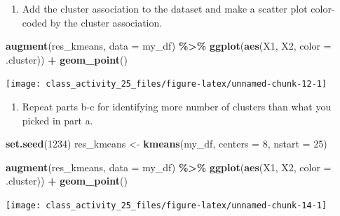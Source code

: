 \documentclass[
]{book}
\newenvironment{Shaded}{\begin{snugshade}}{\end{snugshade}}
\newcommand{\AttributeTok}[1]{\textcolor[rgb]{0.13,0.29,0.53}{#1}}
\newcommand{\DecValTok}[1]{\textcolor[rgb]{0.00,0.00,0.81}{#1}}
\newcommand{\FunctionTok}[1]{\textcolor[rgb]{0.13,0.29,0.53}{\textbf{#1}}}
\newcommand{\NormalTok}[1]{#1}
\newcommand{\OtherTok}[1]{\textcolor[rgb]{0.56,0.35,0.01}{#1}}
\newcommand{\SpecialCharTok}[1]{\textcolor[rgb]{0.81,0.36,0.00}{\textbf{#1}}}
\providecommand{\tightlist}{%
  \setlength{\itemsep}{0pt}\setlength{\parskip}{0pt}}
\begin{document}
\begin{enumerate}
\def\labelenumi{\alph{enumi}.}
\setcounter{enumi}{2}
\tightlist
\item
  Add the cluster association to the dataset and make a scatter plot color-coded by the cluster association.
\end{enumerate}

\begin{Shaded}
\begin{Highlighting}[]
\FunctionTok{augment}\NormalTok{(res\_kmeans, }\AttributeTok{data =}\NormalTok{ my\_df) }\SpecialCharTok{\%\textgreater{}\%}
  \FunctionTok{ggplot}\NormalTok{(}\FunctionTok{aes}\NormalTok{(X1, X2, }\AttributeTok{color =}\NormalTok{ .cluster)) }\SpecialCharTok{+}
  \FunctionTok{geom\_point}\NormalTok{()}
\end{Highlighting}
\end{Shaded}

\texttt{[image: class\_activity\_25\_files/figure-latex/unnamed-chunk-12-1]}

\begin{enumerate}
\def\labelenumi{\alph{enumi}.}
\setcounter{enumi}{3}
\tightlist
\item
  Repeat parts b-c for identifying more number of clusters than what you picked in part a.
\end{enumerate}

\begin{Shaded}
\begin{Highlighting}[]
\FunctionTok{set.seed}\NormalTok{(}\DecValTok{1234}\NormalTok{)}
\NormalTok{res\_kmeans }\OtherTok{\textless{}{-}} \FunctionTok{kmeans}\NormalTok{(my\_df, }\AttributeTok{centers =} \DecValTok{8}\NormalTok{, }\AttributeTok{nstart =} \DecValTok{25}\NormalTok{)}
\end{Highlighting}
\end{Shaded}

\begin{Shaded}
\begin{Highlighting}[]
\FunctionTok{augment}\NormalTok{(res\_kmeans, }\AttributeTok{data =}\NormalTok{ my\_df) }\SpecialCharTok{\%\textgreater{}\%}
  \FunctionTok{ggplot}\NormalTok{(}\FunctionTok{aes}\NormalTok{(X1, X2, }\AttributeTok{color =}\NormalTok{ .cluster)) }\SpecialCharTok{+}
  \FunctionTok{geom\_point}\NormalTok{()}
\end{Highlighting}
\end{Shaded}

\texttt{[image: class\_activity\_25\_files/figure-latex/unnamed-chunk-14-1]}
\end{document}
